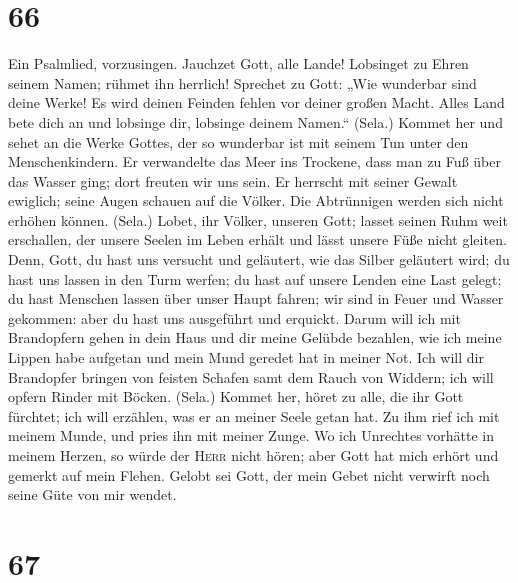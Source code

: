 \hypertarget{section-65}{%
\section{66}\label{section-65}}

 Ein Psalmlied, vorzusingen. Jauchzet Gott, alle Lande!
 Lobsinget zu Ehren seinem Namen; rühmet ihn herrlich!
 Sprechet zu Gott: „Wie wunderbar sind deine Werke! Es
wird deinen Feinden fehlen vor deiner großen Macht.  Alles
Land bete dich an und lobsinge dir, lobsinge deinem Namen.`` (Sela.)
 Kommet her und sehet an die Werke Gottes, der so
wunderbar ist mit seinem Tun unter den Menschenkindern. 
Er verwandelte das Meer ins Trockene, dass man zu Fuß über das Wasser
ging; dort freuten wir uns sein.  Er herrscht mit seiner
Gewalt ewiglich; seine Augen schauen auf die Völker. Die Abtrünnigen
werden sich nicht erhöhen können. (Sela.)  Lobet, ihr
Völker, unseren Gott; lasset seinen Ruhm weit erschallen, 
der unsere Seelen im Leben erhält und lässt unsere Füße nicht gleiten.
 Denn, Gott, du hast uns versucht und geläutert, wie das
Silber geläutert wird;  du hast uns lassen in den Turm
werfen; du hast auf unsere Lenden eine Last gelegt;  du
hast Menschen lassen über unser Haupt fahren; wir sind in Feuer und
Wasser gekommen: aber du hast uns ausgeführt und erquickt.
 Darum will ich mit Brandopfern gehen in dein Haus und
dir meine Gelübde bezahlen,  wie ich meine Lippen habe
aufgetan und mein Mund geredet hat in meiner Not.  Ich
will dir Brandopfer bringen von feisten Schafen samt dem Rauch von
Widdern; ich will opfern Rinder mit Böcken. (Sela.) 
Kommet her, höret zu alle, die ihr Gott fürchtet; ich will erzählen, was
er an meiner Seele getan hat.  Zu ihm rief ich mit meinem
Munde, und pries ihn mit meiner Zunge.  Wo ich Unrechtes
vorhätte in meinem Herzen, so würde der \textsc{Herr} nicht hören;
 aber Gott hat mich erhört und gemerkt auf mein Flehen.
 Gelobt sei Gott, der mein Gebet nicht verwirft noch
seine Güte von mir wendet.

\hypertarget{section-66}{%
\section{67}\label{section-66}}

